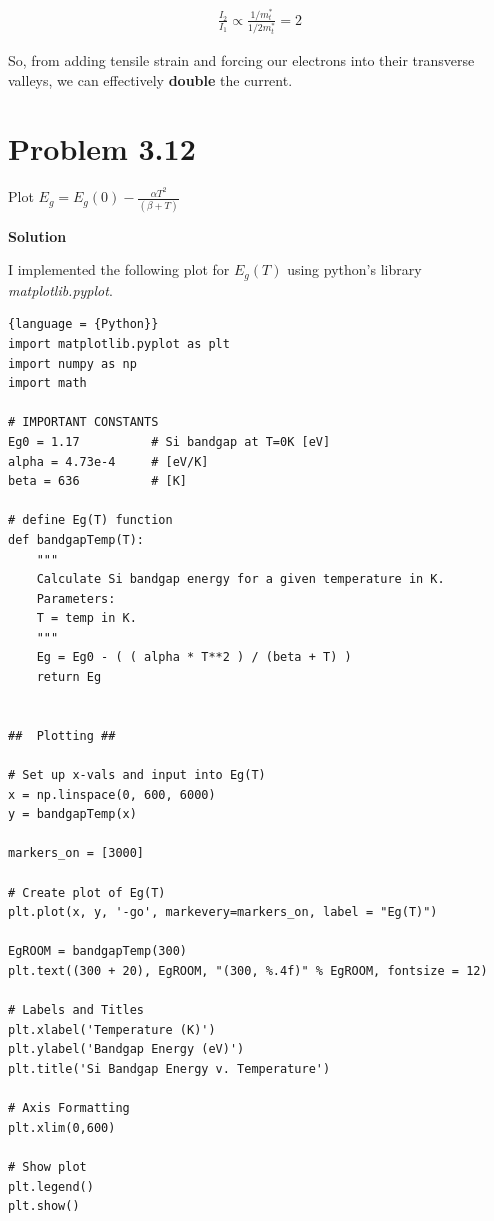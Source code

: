 \documentclass{article}
\begin{document}
\begin{align*}
    \boxed{
        \frac{I_2}{I_1} \propto \frac{1 / m^*_t}{1 / 2m^*_t} = 2
    }
\end{align*}

So, from adding tensile strain and forcing our electrons into their transverse valleys, we can effectively \textbf{double} the current.

\section*{Problem 3.12}

Plot \(E_g = E_g(0) - \frac{\alpha T^2}{(\beta + T)}\) \bigskip

\textbf{Solution}

I implemented the following plot for \(E_g(T)\) using python's library \textit{matplotlib.pyplot}.

\begin{lstlisting}{language = {Python}}
import matplotlib.pyplot as plt
import numpy as np
import math

# IMPORTANT CONSTANTS
Eg0 = 1.17          # Si bandgap at T=0K [eV]
alpha = 4.73e-4     # [eV/K]
beta = 636          # [K]

# define Eg(T) function
def bandgapTemp(T):
    """
    Calculate Si bandgap energy for a given temperature in K.
    Parameters:
    T = temp in K.
    """
    Eg = Eg0 - ( ( alpha * T**2 ) / (beta + T) )
    return Eg


##  Plotting ##

# Set up x-vals and input into Eg(T)
x = np.linspace(0, 600, 6000)
y = bandgapTemp(x)

markers_on = [3000]

# Create plot of Eg(T)
plt.plot(x, y, '-go', markevery=markers_on, label = "Eg(T)")

EgROOM = bandgapTemp(300)
plt.text((300 + 20), EgROOM, "(300, %.4f)" % EgROOM, fontsize = 12)

# Labels and Titles
plt.xlabel('Temperature (K)')
plt.ylabel('Bandgap Energy (eV)')
plt.title('Si Bandgap Energy v. Temperature')

# Axis Formatting
plt.xlim(0,600)

# Show plot
plt.legend()
plt.show()
\end{lstlisting}
\end{document}
